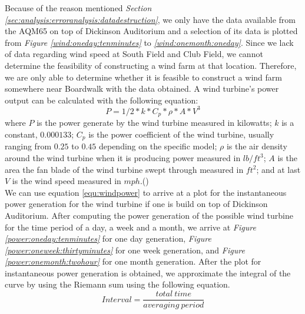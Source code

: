 \documentclass[review]{elsarticle}
\begin{document}
Because of the reason mentioned \textit{Section \ref{sec:analysis:erroranalysis:datadestruction}}, we only have the data available from the AQM65 on top of Dickinson Auditorium and a selection of its data is plotted 
from \textit{Figure \ref{wind:oneday:tenminutes}} to \textit{\ref{wind:onemonth:oneday}}. Since we lack of data regarding wind speed at South Field and Club Field, we cannot determine the feasibility of constructing a 
wind farm at that location. Therefore, we are only able to determine whether it is feasible to construct a wind farm somewhere near Boardwalk with the data obtained. A wind turbine's power output can 
be calculated with the following equation:
\begin{equation}
    \label{equ:windpower}
    P=1/2*k*C_{p}*\rho*A*V^3
\end{equation}
where $P$ is the power generate by the wind turbine measured in kilowatts; $k$ is a constant, $0.000133$; $C_{p}$ is the power coefficient of the wind turbine, usually ranging from $0.25$ to $0.45$ depending on the 
specific model; $\rho$ is the air density around the wind turbine when it is producing power measured in $lb/ft^3$; $A$ is the area the fan blade of the wind turbine swept through measured in $ft^2$; and at last $V$ 
is the wind speed measured in $mph$.(\cite{capability_of_wind_power_accomodation_in_regional_power_grids})
\\\indent We can use equation \ref{equ:windpower} to arrive at a plot for the instantaneous power generation for the wind turbine if one is build on top of Dickinson Auditorium. After computing the power generation 
of the possible wind turbine for the time period of a day, a week and a month, we arrive at \textit{Figure \ref{power:oneday:tenminutes}} for one day generation, \textit{Figure \ref{power:oneweek:thirtyminutes}} for 
one week generation, and \textit{Figure \ref{power:onemonth:twohour}} for one month generation. After the plot for instantaneous power generation is obtained, we approximate the integral of the curve by using 
the Riemann sum using the following equation.
\begin{equation}
    \label{equ:windinterval}
    Interval = \frac{total\ time}{averaging\ period}
\end{equation}
\end{document}
